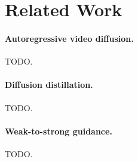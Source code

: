 \section{Related Work}
\label{sec:related}

\paragraph{Autoregressive video diffusion.} TODO.

\paragraph{Diffusion distillation.} TODO.

\paragraph{Weak-to-strong guidance.} TODO.
